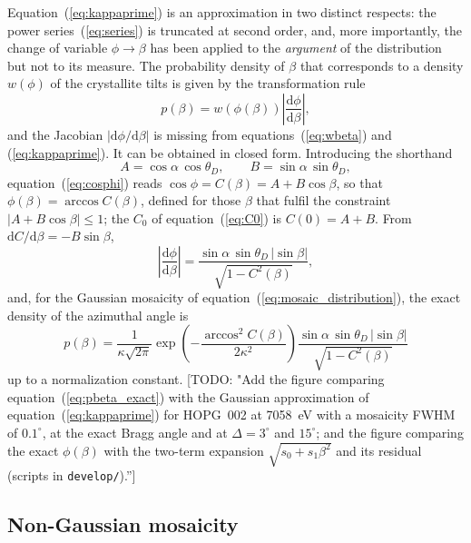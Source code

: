 \documentclass{iucr}
\newcommand{\todo}[1]{{\color{red}[TODO: "#1'']}}
\begin{document}
Equation~(\ref{eq:kappaprime}) is an approximation in two distinct respects: the
power series~(\ref{eq:series}) is truncated at second order, and, more importantly,
the change of variable $\phi \rightarrow \beta$ has been applied to the
\emph{argument} of the distribution but not to its measure. The probability density
of $\beta$ that corresponds to a density $w(\phi)$ of the crystallite tilts is
given by the transformation rule
\begin{equation}
p(\beta) = w\left( \phi(\beta) \right) \left| \frac{\mathrm{d}\phi}{\mathrm{d}\beta} \right| ,
\label{eq:pbeta}
\end{equation}
and the Jacobian $|\mathrm{d}\phi/\mathrm{d}\beta|$ is missing from
equations~(\ref{eq:wbeta}) and (\ref{eq:kappaprime}). It can be obtained in closed
form. Introducing the shorthand
\begin{equation}
A = \cos\alpha \, \cos\theta_D , \qquad B = \sin\alpha \, \sin\theta_D ,
\label{eq:AB}
\end{equation}
equation~(\ref{eq:cosphi}) reads $\cos\phi = C(\beta) = A + B\cos\beta$, so that
$\phi(\beta) = \arccos C(\beta)$, defined for those $\beta$ that fulfil the
constraint $|A + B\cos\beta| \le 1$; the $C_0$ of equation~(\ref{eq:C0}) is
$C(0) = A + B$. From $\mathrm{d}C/\mathrm{d}\beta = -B\sin\beta$,
\begin{equation}
\left| \frac{\mathrm{d}\phi}{\mathrm{d}\beta} \right| =
   \frac{\sin\alpha \, \sin\theta_D \, |\sin\beta|}{\sqrt{1 - C^2(\beta)}} ,
\label{eq:jacobian}
\end{equation}
and, for the Gaussian mosaicity of equation~(\ref{eq:mosaic_distribution}), the
exact density of the azimuthal angle is
\begin{equation}
p(\beta) = \frac{1}{\kappa\sqrt{2\pi}}
   \exp\left( -\frac{\arccos^2 C(\beta)}{2\kappa^2} \right)
   \frac{\sin\alpha \, \sin\theta_D \, |\sin\beta|}{\sqrt{1 - C^2(\beta)}}
\label{eq:pbeta_exact}
\end{equation}
up to a normalization constant. \todo{Add the figure comparing
equation~(\ref{eq:pbeta_exact}) with the Gaussian approximation
of equation~(\ref{eq:kappaprime}) for HOPG~002 at 7058~eV with a mosaicity FWHM of
$0.1^\circ$, at the exact Bragg angle and at $\Delta = 3^\circ$ and $15^\circ$;
and the figure comparing the exact $\phi(\beta)$ with the two-term expansion
$\sqrt{s_0 + s_1\beta^2}$ and its residual (scripts in \texttt{develop/}).}

\subsection{Non-Gaussian mosaicity}
\label{sec:geometry:nongaussian}
\end{document}
